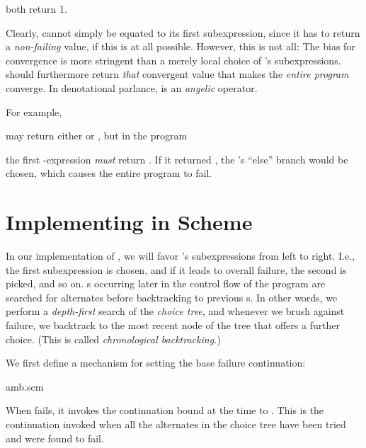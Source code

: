 
\n both return 1.

Clearly,  cannot simply be equated to its first
subexpression, since it has to return a {\em non-failing}
value, if this is at all possible.  However, this is not
all: The bias for convergence is more stringent than a
merely local choice of ’s subexpressions.  
should furthermore return {\em that} convergent value
that makes the {\em entire program} converge.  In
denotational parlance,  is an {\em angelic}
operator.

For example,


\n may return either  or , but in the program


\n the first -expression {\em must} return .
If it returned , the ’s “else” branch would be
chosen, which causes the entire program to fail.

\section{Implementing  in Scheme}  

In our implementation of , we will favor
’s subexpressions from left to right.  I.e., the
first subexpression is chosen, and if it leads to overall
failure, the second is picked, and so on.  s occurring
later in the control flow of the program are searched for
alternates before backtracking to previous s.  In
other words, we perform a {\em depth-first} search of the
 {\em choice tree}, and whenever we brush against
failure, we backtrack to the most recent node of the tree
that offers a further choice.  (This is called {\em
chronological backtracking.})

We first define a mechanism for setting the base failure
continuation:

\scmfilename amb.scm

\n When  fails, it invokes the continuation bound at
the time to .  This is the continuation invoked
when all the alternates in the  choice tree have been
tried and were found to fail.

